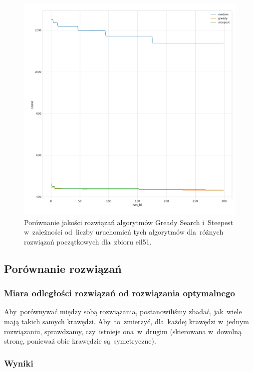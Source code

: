 \begin{figure}[H]
\begin{center}
\includegraphics[width=1.0\textwidth]{graphs/multi_start_scoreeil51.pdf}
\end{center}
\caption{Porównanie jakości rozwiązań algorytmów Gready Search i~Steepest w~zależności od~liczby uruchomień tych algorytmów dla~różnych rozwiązań początkowych dla~zbioru eil51.}
\label{fig:more_eil}
\end{figure}

\subsection{Porównanie rozwiązań}

\subsubsection{Miara odległości rozwiązań od rozwiązania optymalnego}

Aby~porównywać między sobą rozwiązania, postanowiliśmy zbadać, jak~wiele mają takich samych krawędzi. Aby~to~zmierzyć, dla~każdej krawędzi w~jednym rozwiązaniu, sprawdzamy, czy~istnieje ona~w~drugim (skierowana w~dowolną stronę, ponieważ obie krawędzie są~symetryczne).

\subsubsection{Wyniki}

